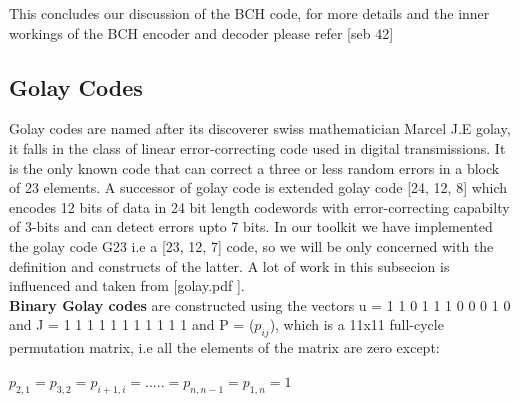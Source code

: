 This concludes our discussion of the BCH code, for more details and the inner workings of the BCH encoder and decoder please refer [seb 42]

\subsection{Golay Codes}
\label{golay_related}
Golay codes are named after its discoverer swiss mathematician Marcel J.E golay, it falls in the class of linear error-correcting code used in digital transmissions. It is the only known code that can correct a three or less random errors in a block of 23 elements. A successor of golay code is extended golay code [24, 12, 8] which encodes 12 bits of data in 24 bit length codewords with error-correcting capabilty of 3-bits and can detect errors upto 7 bits. In our toolkit we have implemented
the golay code G23 i.e a [23, 12, 7] code, so we will be only concerned with the definition and constructs of the latter. A lot of work in this subsecion is influenced and taken from [golay.pdf ].\\

\textbf{Binary Golay codes} are constructed using the vectors u = 1 1 0 1 1 1 0 0 0 1 0 and J = 1 1 1 1 1 1 1 1 1 1 1 and P = ($p_{ij}$), which is a 11x11 full-cycle permutation matrix, i.e all the elements of the matrix are zero except:

\tab \tab \tab $p_{2,1} = p_{3,2} = p_{i+1,i} = . . . . . = p_{n,n-1} = p_{1,n} = 1$

